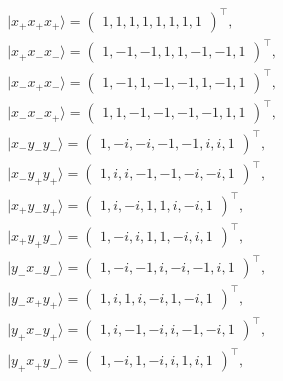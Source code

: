 \documentclass[sn-mathphys]{sn-jnl}%
\theoremstyle{thmstyleone}%
\theoremstyle{thmstyletwo}%
\theoremstyle{thmstylethree}%
\begin{document}
\begin{equation}
\begin{aligned}
& \vert x_+  x_+  x_+ \rangle = \begin{pmatrix}1, 1, 1, 1, 1, 1, 1, 1\end{pmatrix}^\intercal , \\
& \vert x_+  x_-  x_- \rangle = \begin{pmatrix}1, -1, -1, 1, 1, -1, -1, 1\end{pmatrix}^\intercal , \\
& \vert x_-  x_+  x_- \rangle = \begin{pmatrix}1, -1,  1, -1, -1, 1, -1, 1\end{pmatrix}^\intercal , \\
& \vert x_-  x_-  x_+ \rangle = \begin{pmatrix}1, 1, -1, -1, -1, -1, 1, 1\end{pmatrix}^\intercal , \\
& \vert x_-  y_-  y_- \rangle = \begin{pmatrix}1, -i, -i, -1, -1, i, i, 1\end{pmatrix}^\intercal , \\
& \vert x_-  y_+  y_+ \rangle = \begin{pmatrix}1, i, i, -1, -1, -i, -i, 1\end{pmatrix}^\intercal , \\
& \vert x_+  y_-  y_+ \rangle = \begin{pmatrix}1, i, -i, 1, 1, i, -i, 1\end{pmatrix}^\intercal , \\
& \vert x_+  y_+  y_- \rangle = \begin{pmatrix}1, -i, i, 1, 1, -i, i, 1 \end{pmatrix}^\intercal , \\
& \vert y_-  x_-  y_- \rangle = \begin{pmatrix}1, -i, -1, i, -i, -1, i, 1\end{pmatrix}^\intercal , \\
& \vert y_-  x_+  y_+ \rangle = \begin{pmatrix}1, i, 1, i, -i, 1, -i, 1\end{pmatrix}^\intercal , \\
& \vert y_+  x_-  y_+ \rangle = \begin{pmatrix}1, i, -1, -i, i, -1, -i, 1\end{pmatrix}^\intercal , \\
& \vert y_+  x_+  y_- \rangle = \begin{pmatrix}1, -i, 1, -i, i, 1, i, 1 \end{pmatrix}^\intercal , \\

\end{aligned}
\end{equation}
\end{document}
